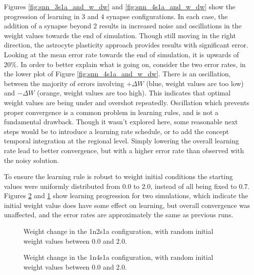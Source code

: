 \documentclass[conference]{IEEEtran}
\newcommand{\asvgf}[4]{
	\begin{figure}[!htbp]
    	\centering
		\adjustbox{max width=#4\linewidth}{}
        \caption{#2.}
        \label{#3}
	\end{figure}
}
\begin{document}
Figures \ref{fig:snn_3s1a_and_w_dw} and \ref{fig:snn_4s1a_and_w_dw} show the
progression of learning in 3 and 4 synapse configurations. In each case, the
addition of a synapse beyond 2 results in increased noise and oscillations in
the weight values towards the end of simulation. Though still moving in the
right direction, the astrocyte plasticity approach provides results with
significant error. Looking at the mean error rate towards the end of
simulation, it is upwards of $20\%$. In order to better explain what is
going on, consider the two error rates, in the lower plot of Figure
\ref{fig:snn_4s1a_and_w_dw}. There is an oscillation, between the majority of
errors involving $+\Delta W$ (blue, weight values are too low) and $-\Delta W$
(orange, weight values are too high). This indicates that optimal weight values
are being under and overshot repeatedly. Oscillation which prevents proper
convergence is a common problem in learning rules, and is not a fundamental
drawback. Though it wasn't explored here, some reasonable next steps would be to
introduce a learning rate schedule, or to add the concept temporal integration
at the regional level. Simply lowering the overall learning rate lead to better
convergence, but with a higher error rate than observed with the noisy solution.

To ensure the learning rule is robust to weight initial conditions the starting
values were uniformly distributed from $0.0$ to $2.0$, instead of all being
fixed to $0.7$. Figures \ref{fig:snn_4s1a_and_w_dw_w} and
\ref{fig:snn_2s1a_and_w_dw_w} show learning progression for two simulations,
which indicate the initial weight value does have some effect on learning, but
overall convergence was unaffected, and the error rates are approximately the
same as previous runs.

\asvgf{figures/artifacts/obj3/snn_2s1a_and_w.svg}{Weight change in the 1n2s1a
  configuration, with random initial weight values between $0.0$ and
  $2.0$}{fig:snn_2s1a_and_w_dw_w}{0.9}

\asvgf{figures/artifacts/obj3/snn_4s1a_and_w.svg}{Weight change in the 1n4s1a
  configuration, with random initial weight values between $0.0$ and
  $2.0$}{fig:snn_4s1a_and_w_dw_w}{0.9}
\end{document}

